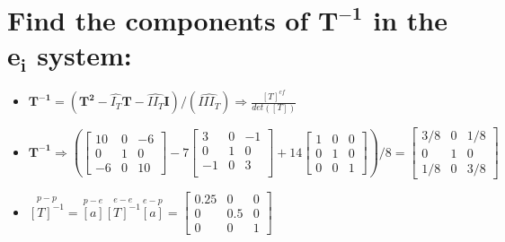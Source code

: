 \documentclass[10pt, letterpaper]{article}
\begin{document}
\section{Find the components of $\bm{T^{-1}}$ in the $\bm{e_i}$ system:}
	\begin{itemize}
		\item $\bm{T^{-1}} = \left( \bm{T^2} - \hat{I_T} \bm{T} - \hat{II_T}  \bm{I} \right) / \left( \hat{III_T} \right) \Rightarrow
			\frac{[T]^{cf}}{det\left( [T] \right)}$
		\item $\bm{T^{-1}} \Rightarrow \left(
			\begin{bmatrix}
				10 & 0 & -6 \\
				0 & 1 & 0 \\
				-6 & 0 & 10
			\end{bmatrix}
			- 7 \begin{bmatrix} 
				3 & 0 &-1 \\ 
				0 & 1 & 0 \\ 
				-1 & 0 & 3\\
			\end{bmatrix} 
			+14 \begin{bmatrix}
				 1 & 0 & 0 \\
				0 & 1 & 0 \\
				0 & 0 & 1
			\end{bmatrix}	\right) / 8 = 
			\begin{bmatrix}
				3/8 & 0 & 1/8 \\
				0 & 1 & 0 \\
				1/8& 0& 3/8
			\end{bmatrix}$
		\item $\overset{p-p}{[T]^{-1}}  = \overset{p-e}{[a]} \overset{e-e}{[T]^{-1}} \overset{e-p}{[a]} =
			\begin{bmatrix}
				0.25 & 0 & 0 \\
				0 & 0.5 & 0 \\
				0 & 0 & 1
			\end{bmatrix}$
	\end{itemize}
 
\end{document}
